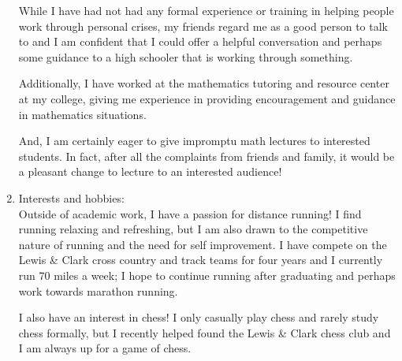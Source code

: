 \documentclass[12]{amsart}
\begin{document}
\begin{enumerate}
        While I have had not had any formal experience or training in helping people work through personal crises, my friends regard me as a good person to talk to and I am confident that I could offer a helpful conversation and perhaps some guidance to a high schooler that is working through something.

        Additionally, I have worked at the mathematics tutoring and resource center at my college, giving me experience in providing encouragement and guidance in mathematics situations.
        
        And, I am certainly eager to give impromptu math lectures to interested students. In fact, after all the complaints from friends and family, it would be a pleasant change to lecture to an interested audience!\\

    \item Interests and hobbies:\\
        Outside of academic work, I have a passion for distance running! I find running relaxing and refreshing, but I am also drawn to the competitive nature of running and the need for self improvement. I have compete on the Lewis \& Clark cross country and track teams for four years and I currently run 70 miles a week; I hope to continue running after graduating and perhaps work towards marathon running.
        
        I also have an interest in chess! I only casually play chess and rarely study chess formally, but I recently helped found the Lewis \& Clark chess club and I am always up for a game of chess.

    \end{enumerate}
\end{document}
